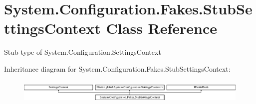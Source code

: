 \hypertarget{class_system_1_1_configuration_1_1_fakes_1_1_stub_settings_context}{\section{System.\-Configuration.\-Fakes.\-Stub\-Settings\-Context Class Reference}
\label{class_system_1_1_configuration_1_1_fakes_1_1_stub_settings_context}
}


Stub type of System.\-Configuration.\-Settings\-Context 


Inheritance diagram for System.\-Configuration.\-Fakes.\-Stub\-Settings\-Context\-:\begin{figure}[H]
\begin{center}
\leavevmode
\includegraphics[height=1.166667cm]{class_system_1_1_configuration_1_1_fakes_1_1_stub_settings_context}
\end{center}
\end{figure}
